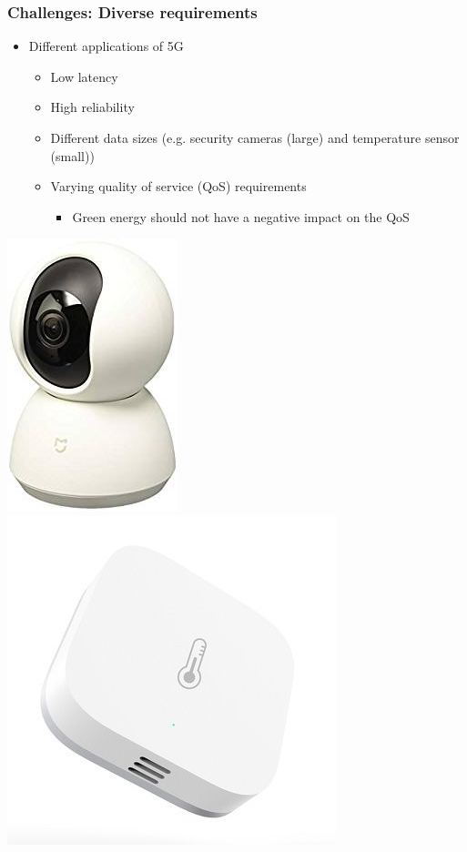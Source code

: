 \documentclass[a4paper,11pt,handout]{beamer}
\begin{document}
\begin{frame}
	\frametitle{Challenges: Diverse requirements}
            \begin{itemize}
\item Different applications of 5G
\begin{itemize}
\item Low latency 
\item High reliability
\item Different data sizes (e.g. security cameras (large) and temperature sensor (small))
\item Varying quality of service (QoS) requirements
\begin{itemize}
\item Green energy should not have a negative impact on the QoS
\end{itemize}
\end{itemize}
\end{itemize}
\begin{center}
	\includegraphics[scale=0.4]{Smart_camara} 
    \includegraphics[scale=0.3]{Smart_temp}
\end{center}
\end{frame}
\end{document}
